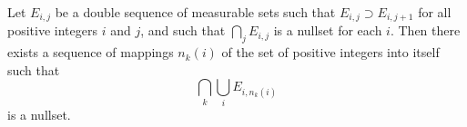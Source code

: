 Let $E_{i,j}$ be a double sequence of measurable sets such that $E_{i,j} \supset E_{i,j+1}$ for all positive integers $i$ and $j$, and such that $\bigcap_j E_{i,j}$ is a nullset for each $i$. Then there exists a sequence of mappings $n_k(i)$ of the set of positive integers into itself such that
$$\bigcap_k \bigcup_i E_{i,n_k(i)}$$
is a nullset.
